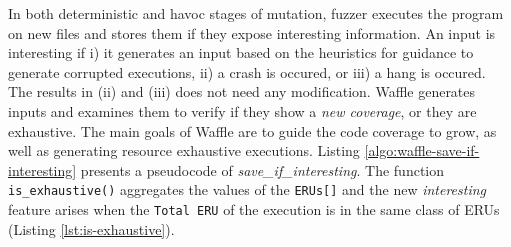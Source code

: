 
In both deterministic and havoc stages of mutation, fuzzer executes the program on new files and stores them if they expose interesting information. An input is interesting if i) it generates an input based on the heuristics for guidance to generate corrupted executions, ii) a crash is occured, or iii) a hang is occured. The results in (ii) and (iii) does not need any modification. Waffle generates inputs and examines them to verify if they show a \textit{new coverage}, or they are exhaustive. The main goals of Waffle are to guide the code coverage to grow, as well as generating resource exhaustive executions. Listing \ref{algo:waffle-save-if-interesting} presents a pseudocode of \textit{save\_if\_interesting}. The function \texttt{is\_exhaustive()} aggregates the values of the \texttt{ERUs[]} and the new \textit{interesting} feature arises when the \texttt{Total ERU} of the execution is in the same class of ERUs (Listing \ref{lst:is-exhaustive}). 




